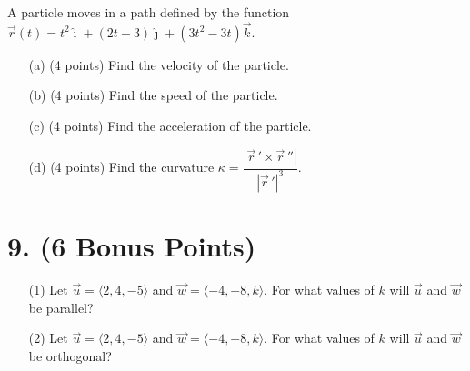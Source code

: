 A particle moves in a path defined by the function $\vec{r}(t) = t^2 \hat{\imath} + (2t - 3) \hat{\jmath} + (3t^2 - 3t) \vec{k}$.

\begin{itemize}
    \item[(a)] (4 points) Find the velocity of the particle.
    \item[(b)] (4 points) Find the speed of the particle.
    \item[(c)] (4 points) Find the acceleration of the particle.
    \item[(d)] (4 points) Find the curvature $\kappa = \dfrac{|\vec{r}\,' \times \vec{r}\,''|}{|\vec{r}\,'|^3}$.
\end{itemize}

\newpage

\section*{9. (6 Bonus Points)}

\begin{itemize}
    \item[(1)] Let $\vec{u} = \langle 2, 4, -5 \rangle$ and $\vec{w} = \langle -4, -8, k \rangle$. For what values of $k$ will $\vec{u}$ and $\vec{w}$ be parallel?
    \item[(2)] Let $\vec{u} = \langle 2, 4, -5 \rangle$ and $\vec{w} = \langle -4, -8, k \rangle$. For what values of $k$ will $\vec{u}$ and $\vec{w}$ be orthogonal?
\end{itemize}


